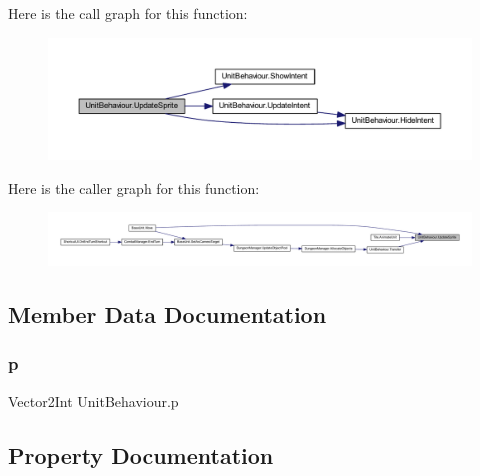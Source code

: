 Here is the call graph for this function\+:\nopagebreak
\begin{figure}[H]
\begin{center}
\leavevmode
\includegraphics[width=350pt]{class_unit_behaviour_a559fdec9ef2c1c1a6c1a863cb868bce5_cgraph}
\end{center}
\end{figure}
Here is the caller graph for this function\+:\nopagebreak
\begin{figure}[H]
\begin{center}
\leavevmode
\includegraphics[width=350pt]{class_unit_behaviour_a559fdec9ef2c1c1a6c1a863cb868bce5_icgraph}
\end{center}
\end{figure}


\subsection{Member Data Documentation}
\mbox{\label{class_unit_behaviour_ae1d622ff10d142433b35f6c2352b97e4}} 
\subsubsection{\texorpdfstring{p}{p}}
{\footnotesize\ttfamily Vector2\+Int Unit\+Behaviour.\+p}



\subsection{Property Documentation}
\mbox{\label{class_unit_behaviour_a05cd74b1093c4a86d9a3556af9b3dad3}} 
